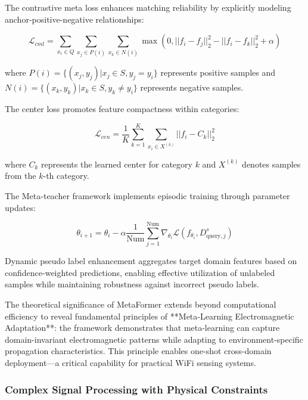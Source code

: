\documentclass[journal]{IEEEtran}
\begin{document}
The contrastive meta loss enhances matching reliability by explicitly modeling anchor-positive-negative relationships:

\begin{equation}
\mathcal{L}_{cml} = \sum_{x_i \in Q} \sum_{x_j \in P(i)} \sum_{x_k \in N(i)} \max(0, ||f_i - f_j||_2^2 - ||f_i - f_k||_2^2 + \alpha)
\label{eq:metaformer_contrastive_loss}
\end{equation}

where $P(i) = \{(x_j, y_j) | x_j \in S, y_j = y_i\}$ represents positive samples and $N(i) = \{(x_k, y_k) | x_k \in S, y_k \neq y_i\}$ represents negative samples.

The center loss promotes feature compactness within categories:

\begin{equation}
\mathcal{L}_{cen} = \frac{1}{K} \sum_{k=1}^{K} \sum_{x_i \in X^{(k)}} ||f_i - C_k||_2^2
\label{eq:metaformer_center_loss}
\end{equation}

where $C_k$ represents the learned center for category $k$ and $X^{(k)}$ denotes samples from the $k$-th category.

The Meta-teacher framework implements episodic training through parameter updates:

\begin{equation}
\theta_{i+1} = \theta_i - \alpha \frac{1}{\text{Num}} \sum_{j=1}^{\text{Num}} \nabla_{\theta_i} \mathcal{L}(f_{\theta_i}, D^s_{\text{query},j})
\label{eq:metaformer_meta_update}
\end{equation}

Dynamic pseudo label enhancement aggregates target domain features based on confidence-weighted predictions, enabling effective utilization of unlabeled samples while maintaining robustness against incorrect pseudo labels.

The theoretical significance of MetaFormer extends beyond computational efficiency to reveal fundamental principles of **Meta-Learning Electromagnetic Adaptation**: the framework demonstrates that meta-learning can capture domain-invariant electromagnetic patterns while adapting to environment-specific propagation characteristics. This principle enables one-shot cross-domain deployment—a critical capability for practical WiFi sensing systems.

\subsubsection{Complex Signal Processing with Physical Constraints}
\end{document}
